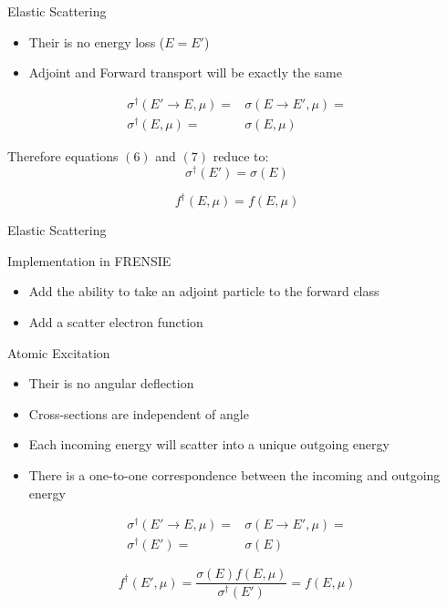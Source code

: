 \documentclass{beamer}
\begin{document}
\begin{frame}{Elastic Scattering}
	\begin{itemize}
	\item Their is no energy loss ($ E = E'$)
	\item Adjoint and Forward transport will be exactly the same
	\end{itemize}
\begin{align}
\sigma^{\dagger}(E' \rightarrow E, \mu) = &\sigma(E \rightarrow E', \mu) = \nonumber \\
\sigma^{\dagger}(E, \mu) = &\sigma(E, \mu)
\end{align}

Therefore equations $(6)$ and $(7)$ reduce to:
\begin{equation}
\sigma^{\dagger}(E') = \sigma(E)
\end{equation}

\begin{equation}
f^{\dagger}(E, \mu) = f(E, \mu)
\end{equation}

\end{frame}

\begin{frame}{Elastic Scattering}

\begin{block}{Implementation in FRENSIE}
	\begin{itemize}
	\item Add the ability to take an adjoint particle to the forward class
	\item Add a scatter electron function       
	\end{itemize}
\end{block}

\end{frame}

\begin{frame}{Atomic Excitation}
	\begin{itemize}
	\item Their is no angular deflection
	\item Cross-sections are independent of angle
	\item Each incoming energy will scatter into a unique outgoing energy
	\item There is a one-to-one correspondence between the incoming and outgoing energy
	\end{itemize}

\begin{align}
\sigma^{\dagger}(E' \rightarrow E, \mu) = &\sigma(E \rightarrow E', \mu) = \nonumber \\
\sigma^{\dagger}(E') = &\sigma(E)
\end{align}

\begin{equation}
f^{\dagger}(E', \mu) = \frac{\sigma(E)f(E, \mu)}{\sigma^{\dagger}(E')} = f(E, \mu)
\end{equation}

\end{frame}
\end{document}
